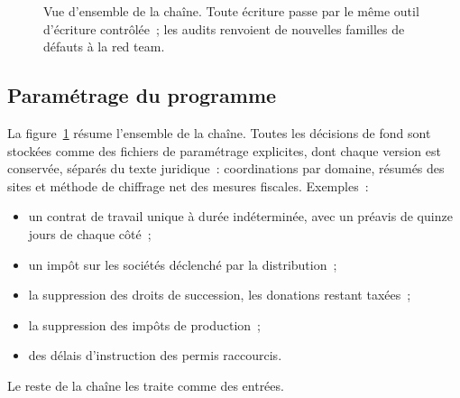 \documentclass[11pt,a4paper]{article}
\begin{document}
\begin{figure}[ht]
\centering
{}
\caption{Vue d'ensemble de la chaîne. Toute écriture passe par le même outil d'écriture contrôlée~; les audits renvoient de nouvelles familles de défauts à la red team.}
\label{fr:fig:pipeline}
\end{figure}

\subsection{Paramétrage du programme}
\label{fr:sec:policy}

La figure~\ref{fr:fig:pipeline} résume l'ensemble de la chaîne. Toutes les décisions de fond sont stockées comme des fichiers de paramétrage explicites, dont chaque version est conservée, séparés du texte juridique~: coordinations par domaine, résumés des sites et méthode de chiffrage net des mesures fiscales. Exemples~:
\begin{itemize}
  \item un contrat de travail unique à durée indéterminée, avec un préavis de quinze jours de chaque côté~;
  \item un impôt sur les sociétés déclenché par la distribution~;
  \item la suppression des droits de succession, les donations restant taxées~;
  \item la suppression des impôts de production~;
  \item des délais d'instruction des permis raccourcis.
\end{itemize}
Le reste de la chaîne les traite comme des entrées.
\end{document}
